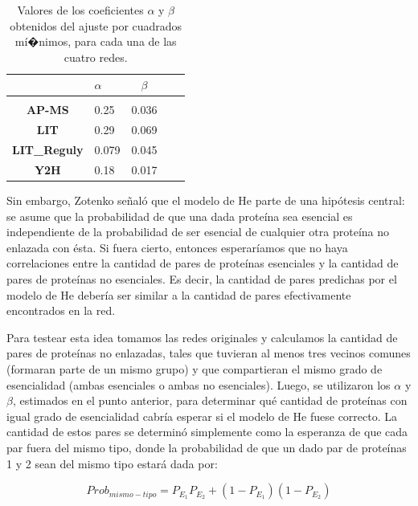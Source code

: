 \documentclass[%
 reprint,
 amsmath,amssymb,
 aps,
]{revtex4-1}
\begin{document}
\begin{table}[h]
\begin{ruledtabular}

\begin{tabular}{ c l c l c  }
{}&           {\bf     $\alpha$ }&{\bf     $\beta$}\\\hline\\
{\bf AP-MS   }&{    0.25}&{  0.036}\\
{\bf LIT   }&{     0.29  }&{0.069}\\
{\bf LIT\_Reguly }&{ 0.079 }&{ 0.045}\\
{\bf Y2H      }&{   0.18 }&{ 0.017}\\
\end{tabular}
\end{ruledtabular}
\caption{Valores de los coeficientes $\alpha$ y $\beta$ obtenidos del ajuste por cuadrados m\'i�nimos, para cada una de las cuatro redes.}
\label{tabla3}
\end{table}

Sin embargo, Zotenko se\~nal\'o que el modelo de He parte de una hip\'otesis central: se asume que la probabilidad de que una dada prote\'ina sea esencial es independiente de la probabilidad de ser esencial de cualquier otra prote\'ina no enlazada con \'esta. Si fuera cierto, entonces esperar\'iamos que no haya correlaciones entre la cantidad de pares de prote\'inas esenciales y la cantidad de pares de prote\'inas no esenciales. Es decir, la cantidad de pares predichas por el modelo de He deber\'ia ser similar a la cantidad de pares efectivamente encontrados en la red.

Para testear esta idea tomamos las redes originales y calculamos la cantidad de pares de prote\'inas no enlazadas, tales que tuvieran al menos tres vecinos comunes (formaran parte de un mismo grupo) y que compartieran el mismo grado de esencialidad (ambas esenciales o ambas no esenciales). Luego, se utilizaron los $\alpha$ y $\beta$, estimados en el punto anterior, para determinar qu\'e cantidad de prote\'inas con igual grado de esencialidad cabr\'ia esperar si el modelo de He fuese correcto. La cantidad de estos pares se determin\'o simplemente como la esperanza de que cada par fuera del mismo tipo, donde la probabilidad de que un dado par de prote\'inas 1 y 2 sean del mismo tipo estar\'a dada por:

\begin{equation}
Prob_{mismo-tipo} = P_{E_1} P_{E_2} + (1-P_{E_1})(1-P_{E_2})
\end{equation}
\end{document}
